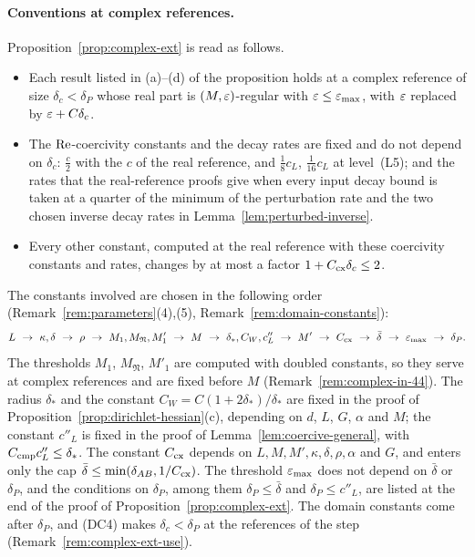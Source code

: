 \paragraph{Conventions at complex references.} Proposition~\ref{prop:complex-ext} is read as follows.
\begin{itemize}
\item Each result listed in (a)--(d) of the proposition holds at a complex reference of size $\delta_c<\delta_P$ whose real part is $(M,\varepsilon)$-regular with $\varepsilon\le\varepsilon_{\max}$, with $\varepsilon$ replaced by $\varepsilon+C\delta_c$.
\item The $\operatorname{Re}$-coercivity constants and the decay rates are fixed and do not depend on $\delta_c$: $\frac c2$ with the $c$ of the real reference, and $\frac18c_L$, $\frac1{16}c_L$ at level~(L5); and the rates that the real-reference proofs give when every input decay bound is taken at a quarter of the minimum of the perturbation rate and the two chosen inverse decay rates in Lemma~\ref{lem:perturbed-inverse}.
\item Every other constant, computed at the real reference with these coercivity constants and rates, changes by at most a factor $1+C_{\rm cx}\delta_c\le2$.
\end{itemize}
The constants involved are chosen in the following order (Remark~\ref{rem:parameters}(4),(5), Remark~\ref{rem:domain-constants}):
\[
L\ \to\ \kappa,\delta\ \to\ \rho\ \to\ M_1,M_{\mathfrak N},M'_1\ \to\ M\ \to\ \delta_*,C_W,c''_L\ \to\ M'\ \to\ C_{\rm cx}\ \to\ \bar\delta\ \to\ \eps_{\max}\ \to\ \delta_P .
\]
The thresholds $M_1$, $M_{\mathfrak N}$, $M'_1$ are computed with doubled constants, so they serve at complex references and are fixed before $M$ (Remark~\ref{rem:complex-in-44}). The radius $\delta_*$ and the constant $C_W=C(1+2\delta_*)/\delta_*$ are fixed in the proof of Proposition~\ref{prop:dirichlet-hessian}(c), depending on $d$, $L$, $G$, $\alpha$ and $M$; the constant $c''_L$ is fixed in the proof of Lemma~\ref{lem:coercive-general}, with $C_{\rm cmp}c''_L\le\delta_*$. The constant $C_{\rm cx}$ depends on $L,M,M',\kappa,\delta,\rho,\alpha$ and $G$, and enters only the cap $\bar\delta\le\min(\delta_{AB},1/C_{\rm cx})$. The threshold $\varepsilon_{\max}$ does not depend on $\bar\delta$ or $\delta_P$, and the conditions on $\delta_P$, among them $\delta_P\le\bar\delta$ and $\delta_P\le c''_L$, are listed at the end of the proof of Proposition~\ref{prop:complex-ext}. The domain constants come after $\delta_P$, and (DC4) makes $\delta_c<\delta_P$ at the references of the step (Remark~\ref{rem:complex-ext-use}).

